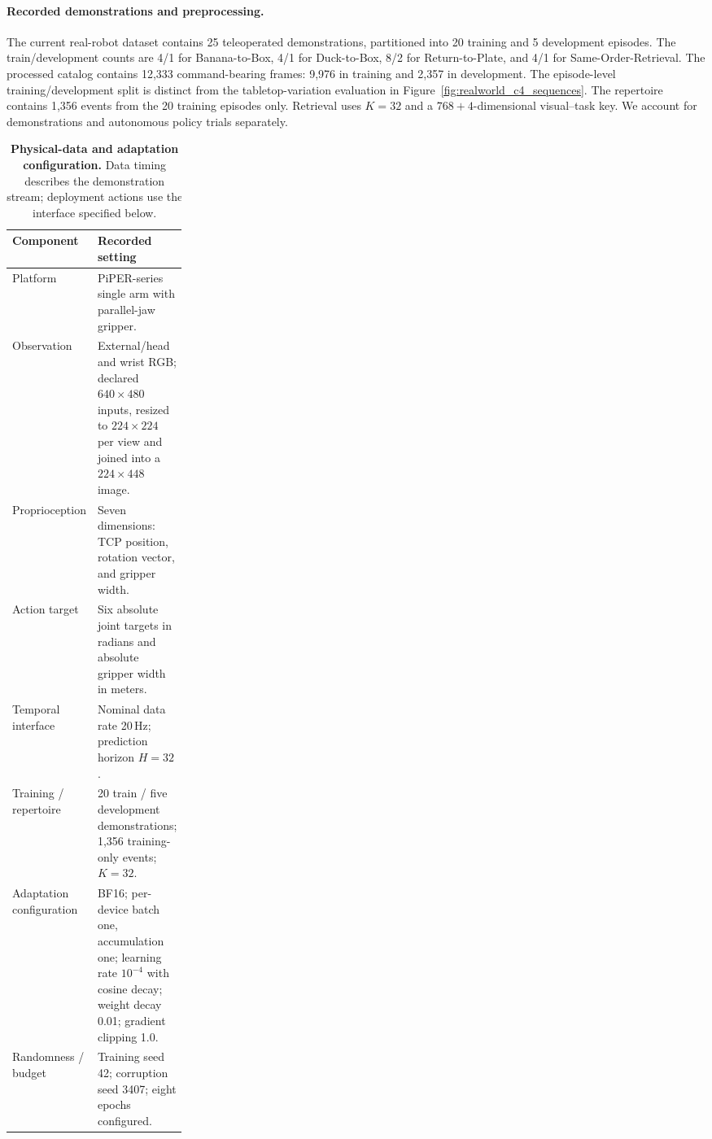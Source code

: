 \paragraph{Recorded demonstrations and preprocessing.}
The current real-robot dataset contains 25 teleoperated demonstrations,
partitioned into 20 training and 5 development episodes.
The train/development counts are 4/1 for Banana-to-Box,
4/1 for Duck-to-Box, 8/2 for Return-to-Plate, and
4/1 for Same-Order-Retrieval.
The processed catalog contains 12,333 command-bearing frames:
9,976 in training and 2,357 in development.
The episode-level training/development split is distinct from the tabletop-variation evaluation in Figure~\ref{fig:realworld_c4_sequences}.
The repertoire contains 1,356 events from the 20 training episodes only.
Retrieval uses $K=32$ and a $768+4$-dimensional visual--task key.
We account for demonstrations and autonomous policy trials separately.

\begin{table}[H]
\centering\small
\caption{\textbf{Physical-data and adaptation configuration.}
Data timing describes the demonstration stream; deployment actions use the interface specified below.}
\label{tab:realworld_hardware}
\begin{tabularx}{\linewidth}{@{}p{0.25\linewidth}X@{}}
\toprule
Component & Recorded setting \\
\midrule
Platform & PiPER-series single arm with parallel-jaw gripper. \\
Observation & External/head and wrist RGB; declared $640\times480$ inputs, resized to $224\times224$ per view and joined into a $224\times448$ image. \\
Proprioception & Seven dimensions: TCP position, rotation vector, and gripper width. \\
Action target & Six absolute joint targets in radians and absolute gripper width in meters. \\
Temporal interface & Nominal data rate 20\,Hz; prediction horizon $H=32$. \\
Training / repertoire & 20 train / five development demonstrations; 1,356 training-only events; $K=32$. \\
Adaptation configuration & BF16; per-device batch one, accumulation one; learning rate $10^{-4}$ with cosine decay; weight decay 0.01; gradient clipping 1.0. \\
Randomness / budget & Training seed 42; corruption seed 3407; eight epochs configured. \\
\bottomrule
\end{tabularx}
\end{table}

